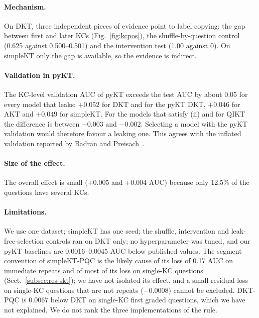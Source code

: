 \paragraph{Mechanism.}
On DKT, three independent pieces of evidence point to label copying: the gap between first and later KCs (Fig.~\ref{fig:kcpos}), the shuffle-by-question control (0.625 against 0.500--0.501) and the intervention test (1.00 against 0). On simpleKT only the gap is available, so the evidence is indirect.

\paragraph{Validation in pyKT.}
The KC-level validation AUC of pyKT exceeds the test AUC by about 0.05 for every model that leaks: $+0.052$ for DKT and for the pyKT DKT, $+0.046$ for AKT and $+0.049$ for simpleKT. For the models that satisfy (ii) and for QIKT the difference is between $-0.003$ and $-0.002$. Selecting a model with the pyKT validation would therefore favour a leaking one. This agrees with the inflated validation reported by Badran and Preisach~\cite{DBLP:conf/csedu/BadranP25a}.

\paragraph{Size of the effect.}
The overall effect is small ($+0.005$ and $+0.004$ AUC) because only 12.5\% of the questions have several KCs.


\paragraph{Limitations.}
We use one dataset; simpleKT has one seed; the shuffle, intervention and leak-free-selection controls ran on DKT only; no hyperparameter was tuned, and our pyKT baselines are 0.0016--0.0045 AUC below published values. The segment convention of simpleKT-PQC is the likely cause of its loss of 0.17 AUC on immediate repeats and of most of its loss on single-KC questions (Sect.~\ref{subsec:res-skt}); we have not isolated its effect, and a small residual loss on single-KC questions that are not repeats ($-$0.0008) cannot be excluded. DKT-PQC is 0.0067 below DKT on single-KC first graded questions, which we have not explained. We do not rank the three implementations of the rule.